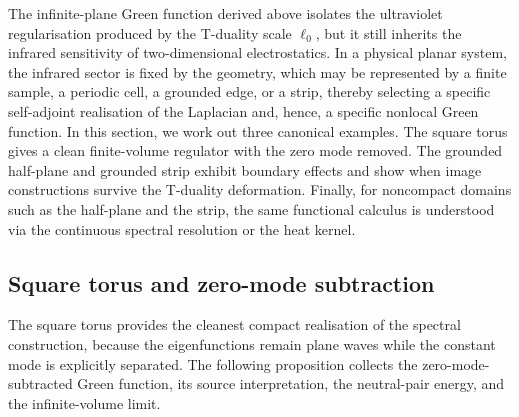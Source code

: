 \documentclass[openacc]{rsproca_new}%
\begin{document}
The infinite-plane Green function derived above isolates the ultraviolet regularisation produced by the T-duality scale $\ell_0$, but it still inherits the infrared sensitivity of two-dimensional electrostatics. In a physical planar system, the infrared sector is fixed by the geometry, which may be represented by a finite sample, a periodic cell, a grounded edge, or a strip, thereby selecting a specific self-adjoint realisation of the Laplacian and, hence, a specific nonlocal Green function. In this section, we work out three canonical examples. The square torus gives a clean finite-volume regulator with the zero mode removed. The grounded half-plane and grounded strip exhibit boundary effects and show when image constructions survive the T-duality deformation. Finally, for noncompact domains such as the half-plane and the strip, the same functional calculus is understood via the continuous spectral resolution or the heat kernel.

\subsection{Square torus and zero-mode subtraction}
\label{subsec:torus}

The square torus provides the cleanest compact realisation of the spectral construction, because the eigenfunctions remain plane waves while the constant mode is explicitly separated. The following proposition collects the zero-mode-subtracted Green function, its source interpretation, the neutral-pair energy, and the infinite-volume limit.
\end{document}
